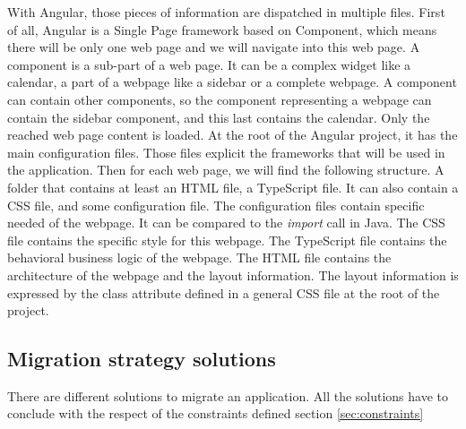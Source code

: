 \documentclass[conference]{IEEEtran}
\begin{document}
    
    With Angular, those pieces of information are dispatched in multiple files.
    First of all, Angular is a Single Page framework based on Component,
        which means there will be only one web page 
        and we will navigate into this web page.
    A component is a sub-part of a web page.
    It can be a complex widget like a calendar,
        a part of a webpage like a sidebar
        or a complete webpage.
    A component can contain other components, 
        so the component representing a webpage can contain the sidebar component,
        and this last contains the calendar.
    Only the reached web page content is loaded.
    At the root of the Angular project,
        it has the main configuration files.
    Those files explicit the frameworks that will be used in the application.
    Then for each web page, we will find the following structure.
    A folder that contains at least an HTML file, a TypeScript file.
    It can also contain a CSS file, and some configuration file.
    The configuration files contain specific needed of the webpage.
    It can be compared to the \textit{import} call in Java.
    The CSS file contains the specific style for this webpage.
    The TypeScript file contains the behavioral business logic of the webpage. 
    The HTML file contains the architecture of the webpage and the layout information.
    The layout information is expressed by the class attribute defined in a general CSS file 
        at the root of the project. 
    
    
    \subsection{Migration strategy solutions}
    
    There are different solutions to migrate an application.
    All the solutions have to conclude with the respect of the constraints defined section \ref{sec:constraints}
    
\end{document}
